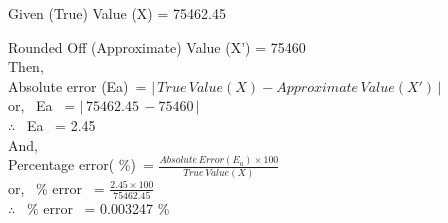 \documentclass[12pt]{article}
\begin{document}
Given (True) Value (X) = 75462.45

Rounded Off (Approximate) Value (X') = 75460\\
Then, \\

Absolute error (Ea) \hspace{0.2in}\,=\,\,$ \vert \, True \, Value(X) - Approximate \,  Value (X') \, \vert $\\

or, \, Ea \hspace{1in} \, =\,\,$ \vert \,  75462.45  \,- 75460\, \vert$ \\

$\therefore$ \, Ea \hspace{1.1in} \, =\,\,2.45\\
And,\\

Percentage error( \%)  \hspace{0.5 in}\,=\,\,$\frac{{Absolute \, Error (E_a)} \times 100}{{True \, Value(X)}}$ \\

or, \, \% error \hspace{1in} \, =\,\,$ \frac{{2.45 \times 100}}{75462.45}$\\

$\therefore$ \, \% error \hspace{1.1in} \, =\,\,0.003247 \%\\
\end{document}
